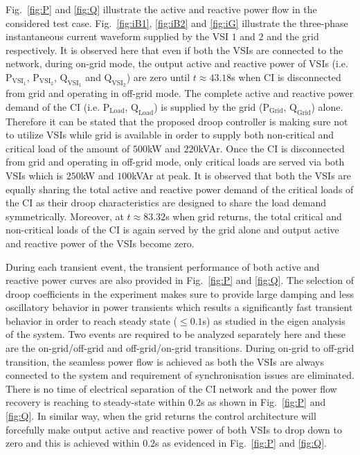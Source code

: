 \documentclass[journal]{IEEEtran}
\begin{document}
\par Fig.~\ref{fig:P} and \ref{fig:Q} illustrate the active and reactive power flow in the considered test case. Fig.~\ref{fig:iB1}, \ref{fig:iB2} and \ref{fig:iG} illustrate the three-phase instantaneous current waveform supplied by the VSI $1$ and $2$ and the grid respectively. It is observed here that even if both the VSIs are connected to the network, during on-grid mode, the output active and reactive power of VSIs (i.e. $\mathrm{P}_\mathrm{VSI_\mathrm{1}}$, $\mathrm{P}_\mathrm{VSI_\mathrm{2}}$, $\mathrm{Q}_\mathrm{VSI_\mathrm{1}}$ and $\mathrm{Q}_\mathrm{VSI_\mathrm{2}}$) are zero until $t\approx43.18$s when CI is disconnected from grid and operating in off-grid mode. The complete active and reactive power demand of the CI (i.e. $\mathrm{P}_\mathrm{Load}$, $\mathrm{Q}_\mathrm{Load}$) is supplied by the grid ($\mathrm{P}_\mathrm{Grid}$, $\mathrm{Q}_\mathrm{Grid}$) alone. Therefore it can be stated that the proposed droop controller is making sure not to utilize VSIs while grid is available in order to supply both non-critical and critical load of the amount of $500$kW and $220$kVAr. Once the CI is disconnected from grid and operating in off-grid mode, only critical loads are served via both VSIs which is $250$kW and $100$kVAr at peak. It is observed that both the VSIs are equally sharing the total active and reactive power demand of the critical loads of the CI as their droop characteristics are designed to share the load demand symmetrically. Moreover, at $t\approx83.32$s when grid returns, the total critical and non-critical loads of the CI is again served by the grid alone and output active and reactive power of the VSIs become zero. 
\par During each transient event, the transient performance of both active and reactive power curves are also provided in Fig.~\ref{fig:P} and \ref{fig:Q}. The selection of droop coefficients in the experiment makes sure to provide large damping and less oscillatory behavior in power transients which results a significantly fast transient behavior in order to reach steady state ($\le 0.1$s) as studied in the eigen analysis of the system. Two events are required to be analyzed separately here and these are the on-grid/off-grid and off-grid/on-grid transitions. During on-grid to off-grid transition, the seamless power flow is achieved as both the VSIs are always connected to the system and requirement of synchronisation issues are eliminated. There is no time of electrical separation of the CI network and the power flow recovery is reaching to steady-state within $0.2$s as shown in Fig.~\ref{fig:P} and \ref{fig:Q}. In similar way, when the grid returns the control architecture will forcefully make output active and reactive power of both VSIs to drop down to zero and this is achieved within $0.2$s as evidenced in Fig.~\ref{fig:P} and \ref{fig:Q}. 
\end{document}
